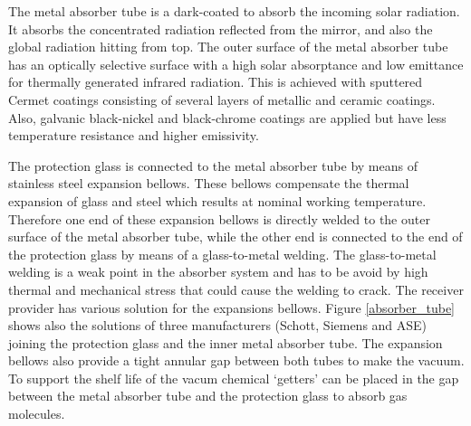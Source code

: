 The metal absorber tube is a dark-coated to absorb the incoming solar radiation. It absorbs the concentrated radiation reflected from the mirror, and also the global radiation hitting from top. The outer surface of the metal absorber tube has an optically selective surface with a high solar absorptance and low emittance for thermally generated infrared radiation. This is achieved with sputtered Cermet coatings consisting of several layers of metallic and ceramic coatings. Also, galvanic black-nickel and black-chrome coatings are applied but have less temperature resistance and higher emissivity. \cite{Platzer2012}



The protection glass is connected to the metal absorber tube by means of stainless steel expansion bellows. These bellows compensate the thermal expansion of glass and steel which results at nominal working temperature. Therefore one end of these expansion bellows is directly welded to the outer surface of the metal absorber tube, while the other end is connected to the end of the protection glass by means of a glass-to-metal welding. The glass-to-metal welding is a weak point in the absorber system and has to be avoid by high thermal and mechanical stress that could cause the welding to crack. The receiver provider has various solution for the expansions bellows. Figure \ref{absorber_tube} shows also the solutions of three manufacturers (Schott, Siemens and ASE) joining the protection glass and the inner metal absorber tube. The expansion bellows also provide a tight annular gap between both tubes to make the vacuum. To support the shelf life of the vacum chemical ‘getters’ can be placed in the gap between the metal absorber tube and the protection glass to absorb gas molecules.
